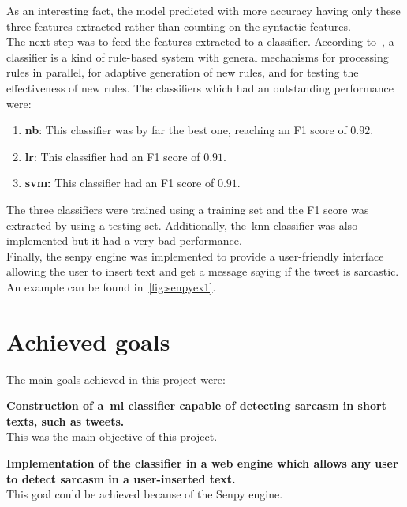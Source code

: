 As an interesting fact, the model predicted with more accuracy having only these three features extracted rather than counting on the syntactic features.\\
The next step was to feed the features extracted to a classifier. According to~\cite{clasif}, a classifier is a kind of rule-based system with general mechanisms for processing rules in parallel, for adaptive generation of new rules, and for testing the effectiveness of new rules. The classifiers which had an outstanding performance were:
\begin{enumerate}
	\item \textbf{\acl{nb}}: This classifier was by far the best one, reaching an F1 score of $0.92$.
	\item \textbf{\acl{lr}}: This classifier had an F1 score of $0.91$.
	\item \textbf{\acl{svm}:} This classifier had an F1 score of $0.91$.
\end{enumerate} 
The three classifiers were trained using a training set and the F1 score was extracted by using a testing set.
Additionally, the~\acl{knn} classifier was also implemented but it had a very bad performance.\\
Finally, the senpy engine was implemented to provide a user-friendly interface allowing the user to insert text and get a message saying if the tweet is sarcastic. An example can be found in~\cref{fig:senpyex1}.

\section{Achieved goals}
The main goals achieved in this project were:
\begin{description}
	\item \textbf{Construction of a~\ac{ml} classifier capable of detecting sarcasm in short texts, such as tweets.}\\
	This was the main objective of this project.
	\item \textbf{Implementation of the classifier in a web engine which allows any user to detect sarcasm in a user-inserted text.}\\
	This goal could be achieved because of the Senpy engine.
	
\end{description}


